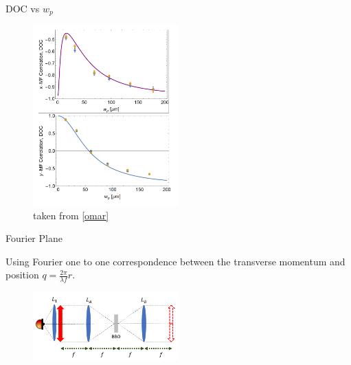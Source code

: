 \documentclass[xcolor=dvipsnames]{beamer}
\begin{document}
\begin{frame}{DOC vs $w_p$}
\begin{figure}

\includegraphics[width=0.5\textwidth]{pictures/correlationGraph.png} 

\caption{taken from \ref{omar}}
 \label{n1}
\end{figure}
\end{frame}
\begin{frame}{Fourier Plane}
\item Using Fourier one to one correspondence  between the transverse momentum and
position $q = \frac{2 \pi}{\lambda f} r$.
\begin{figure}

\includegraphics[width=0.5\textwidth]{pictures/2f.png} 

 \label{n1}
\end{figure}
\end{frame}
\end{document}
